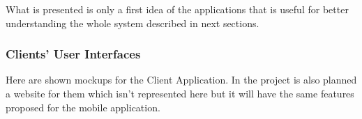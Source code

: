 \documentclass[a4paper]{article}
\begin{document}
\begin{enumerate}[label=\bfseries G\arabic*:]
What is presented is only a first idea of the applications that is useful for better understanding the whole system described in next sections.

\newlength{\mockupWidth}
\setlength{\mockupWidth}{.38\textwidth}

\subsubsection{Clients' User Interfaces}

Here are shown mockups for the Client Application. In the project is also planned a website for them which isn't represented here but it will have the same features proposed for the mobile application.


\end{enumerate}
\end{document}
